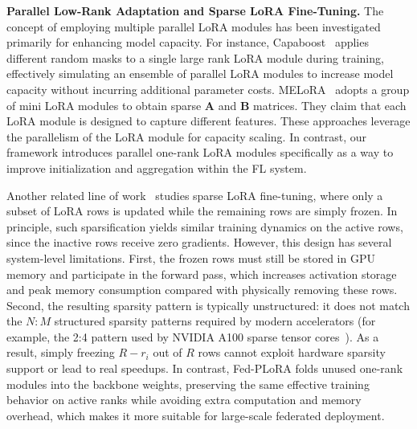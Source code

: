 \documentclass{article} %
\begin{document}
\noindent\textbf{Parallel Low-Rank Adaptation {and Sparse LoRA Fine-Tuning.}} The concept of employing multiple parallel LoRA modules has been investigated primarily for enhancing model capacity. For instance, Capaboost~\cite{haoboincreasing} applies different random masks to a single large rank LoRA module during training, effectively simulating an ensemble of parallel LoRA modules to increase model capacity without incurring additional parameter costs. MELoRA~\cite{ren2024melora} adopts a group of mini LoRA modules to obtain sparse $\mathbf{A}$ and $\mathbf{B}$ matrices. They claim that each LoRA module is designed to capture different features. 
These approaches leverage the parallelism of the LoRA module for capacity scaling.
In contrast, our framework introduces parallel one-rank LoRA modules specifically as a way to improve initialization and aggregation within the FL system.

{
Another related line of work~\cite{zhou2021learning,zhang2022learning} studies sparse LoRA fine-tuning, where only a subset of LoRA rows is updated while the remaining rows are simply frozen. In principle, such sparsification yields similar training dynamics on the active rows, since the inactive rows receive zero gradients. However, this design has several system-level limitations. First, the frozen rows must still be stored in GPU memory and participate in the forward pass, which increases activation storage and peak memory consumption compared with physically removing these rows. Second, the resulting sparsity pattern is typically unstructured: it does not match the $N\!:\!M$ structured sparsity patterns required by modern accelerators (for example, the 2:4 pattern used by NVIDIA A100 sparse tensor cores~\cite{zhou2021learning}). As a result, simply freezing $R - r_i$ out of $R$ rows cannot exploit hardware sparsity support or lead to real speedups. In contrast, Fed-PLoRA folds unused one-rank modules into the backbone weights, preserving the same effective training behavior on active ranks while avoiding extra computation and memory overhead, which makes it more suitable for large-scale federated deployment.
}
\end{document}
